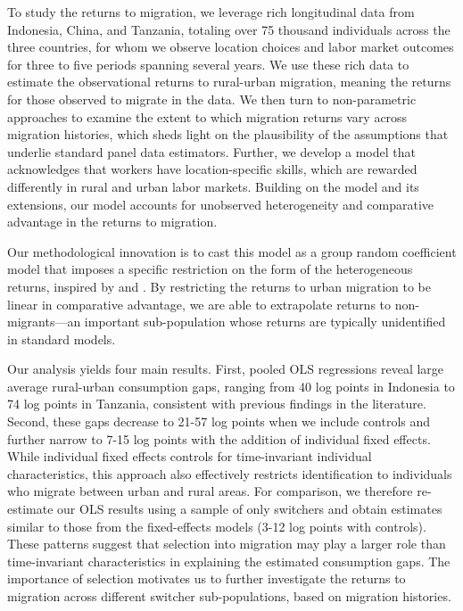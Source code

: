 \documentclass[12pt]{article}
\begin{document}
To study the returns to migration, we leverage rich longitudinal data from Indonesia, China, and Tanzania, totaling over 75 thousand individuals across the three countries, for whom we observe location choices and labor market outcomes for three to five periods spanning several years.
We use these rich data to estimate the observational returns to rural-urban migration, meaning the returns for those observed to migrate in the data.
We then turn to non-parametric approaches to examine the extent to which migration returns vary across migration histories, which sheds light on the plausibility of the assumptions that underlie standard panel data estimators. 
Further, we develop a model that acknowledges that workers have location-specific skills, which are rewarded differently in rural and urban labor markets.
Building on the \cite{royThoughtsDistributionEarnings1951} model and its extensions, our model accounts for unobserved heterogeneity and comparative advantage in the returns to migration.

Our methodological innovation is to cast this model as a group random coefficient model that imposes a specific restriction on the form of the heterogeneous returns, inspired by \cite{suriSelectionComparativeAdvantage2011} and \cite{tjernstromCommentSuri2011}.
By restricting the returns to urban migration to be linear in comparative advantage, we are able to extrapolate returns to non-migrants---an important sub-population whose returns are typically unidentified in standard models. 


Our analysis yields four main results. 
First, pooled OLS regressions reveal large average rural-urban consumption gaps, ranging from 40 log points in Indonesia to 74 log points in Tanzania, consistent with previous findings in the literature.
Second, these gaps decrease to 21-57 log points when we include controls and further narrow to 7-15 log points with the addition of individual fixed effects. 
While individual fixed effects controls for time-invariant individual characteristics, this approach also effectively restricts identification to individuals who migrate between urban and rural areas.
For comparison, we therefore re-estimate our OLS results using a sample of only switchers and obtain estimates similar to those from the fixed-effects models (3-12 log points with controls).
These patterns suggest that selection into migration may play a larger role than time-invariant characteristics in explaining the estimated consumption gaps.
The importance of selection motivates us to further investigate the returns to migration across different switcher sub-populations, based on migration histories.
\end{document}
